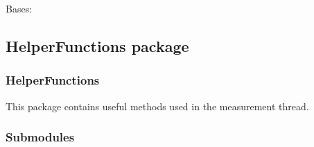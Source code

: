 \documentclass[letterpaper,10pt,english]{sphinxmanual}
\begin{document}
\begin{fulllineitems}
\label{\detokenize{NoSeMazeController/Designs:Designs.settingWindow.Ui_MainWindow}}
\pysigstartsignatures
{}
\pysigstopsignatures
\sphinxAtStartPar
Bases: 

\begin{fulllineitems}
\label{\detokenize{NoSeMazeController/Designs:Designs.settingWindow.Ui_MainWindow.retranslateUi}}
\pysigstartsignatures
{}
\pysigstopsignatures
\end{fulllineitems}


\begin{fulllineitems}
\label{\detokenize{NoSeMazeController/Designs:Designs.settingWindow.Ui_MainWindow.setupUi}}
\pysigstartsignatures
{}
\pysigstopsignatures
\end{fulllineitems}


\end{fulllineitems}


\sphinxstepscope


\subsection{HelperFunctions package}
\label{\detokenize{NoSeMazeController/HelperFunctions:helperfunctions-package}}\label{\detokenize{NoSeMazeController/HelperFunctions::doc}}

\subsubsection{HelperFunctions}
\label{\detokenize{NoSeMazeController/HelperFunctions:helperfunctions}}
\sphinxAtStartPar
This package contains useful methods used in the measurement thread.


\subsubsection{Submodules}
\label{\detokenize{NoSeMazeController/HelperFunctions:submodules}}
\end{document}
